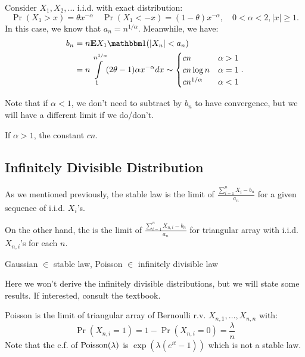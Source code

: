 \documentclass[../main/main.tex]{subfiles}
\begin{document}
Consider $X_1, X_2, \ldots$ i.i.d. with exact distribution: \[
	\Pr(X_1 > x) = \theta x^{-\alpha} \quad \Pr(X_1 < -x) = (1-\theta)x^{-\alpha}, \quad 0 < \alpha < 2, |x| \geq 1.
\] In this case, we know that $a_n = n^{1 / \alpha}$. Meanwhile, we have:
\begin{align*}
	b_n & = n \E X_1 \ind (|X_n| < a_n)                                                                           \\
	    & = n \int\limits_{1}^{n^{1 / \alpha}}(2 \theta -1) \alpha x^{-\alpha}dx \sim \begin{cases}
		cn               & \alpha > 1 \\
		c n \log n       & \alpha = 1 \\
		c n^{1 / \alpha} & \alpha < 1
	\end{cases}.
\end{align*}

Note that if $\alpha < 1$, we don't need to subtract by $b_n$ to have convergence, but we will have a different limit if we do/don't.

\begin{remark}
	If $\alpha > 1$, the constant $c n$.
\end{remark}

\subsection{Infinitely Divisible Distribution}

As we mentioned previously, the stable law is the limit of $\frac{\sum\limits_{i=1}^{n}X_i - b_n}{a_n}$ for a given sequence of i.i.d. $X_i$'s.

On the other hand, the  is the limit of $\frac{\sum\limits_{i=1}^{n}X_{n,i} - b_n}{a_n}$ for triangular array with i.i.d. $X_{n,i}$'s for each $n$.

\begin{example}
	Gaussian $\in$ stable law, Poisson $\in$ infinitely divisible law
\end{example}

Here we won't derive the infinitely divisible distributions, but we will state some results. If interested, consult the textbook.

\begin{example}
	Poisson is the limit of triangular array of Bernoulli r.v. $X_{n,1}, \ldots , X_{n,n}$ with: \[
		\Pr(X_{n,i}=1) = 1- \Pr(X_{n,i} = 0) = \frac{\lambda}{n}
	\] Note that the c.f. of $\text{Poisson}(\lambda)$ is $\exp(\lambda(e^{it}-1))$ which is not a stable law.
\end{example}
\end{document}
